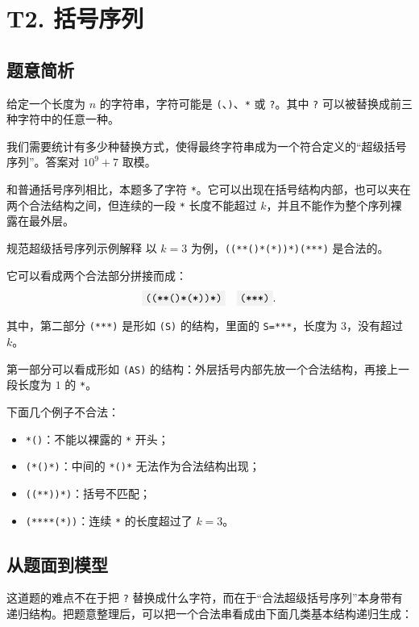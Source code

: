 \documentclass{book}
\newcommand{\code}[1]{\colorbox{codebg}{\texttt{#1}}}  %
\begin{document}
\section{T2. 括号序列}

\subsection{题意简析}

给定一个长度为 $n$ 的字符串，字符可能是 \code{(}、\code{)}、\code{*} 或 \code{?}。其中 \code{?} 可以被替换成前三种字符中的任意一种。

我们需要统计有多少种替换方式，使得最终字符串成为一个符合定义的“超级括号序列”。答案对 $10^9+7$ 取模。

和普通括号序列相比，本题多了字符 \code{*}。它可以出现在括号结构内部，也可以夹在两个合法结构之间，但连续的一段 \code{*} 长度不能超过 $k$，并且不能作为整个序列裸露在最外层。

\begin{examplebox}{规范超级括号序列示例解释}
以 $k=3$ 为例，\code{((**()*(*))*)(***)} 是合法的。

它可以看成两个合法部分拼接而成：
\[
\code{((**()*(*))*)}\quad \code{(***)}.
\]

其中，第二部分 \code{(***)} 是形如 \code{(S)} 的结构，里面的 \code{S=***}，长度为 $3$，没有超过 $k$。

第一部分可以看成形如 \code{(AS)} 的结构：外层括号内部先放一个合法结构，再接上一段长度为 $1$ 的 \code{*}。

下面几个例子不合法：

\begin{itemize}[leftmargin=2em,itemsep=1pt,topsep=2pt,parsep=0pt,partopsep=0pt]
    \item \code{*()}：不能以裸露的 \code{*} 开头；
    \item \code{(*()*)}：中间的 \code{*()*} 无法作为合法结构出现；
    \item \code{((**))*)}：括号不匹配；
    \item \code{(****(*))}：连续 \code{*} 的长度超过了 $k=3$。
\end{itemize}
\end{examplebox}

\subsection{从题面到模型}

这道题的难点不在于把 \code{?} 替换成什么字符，而在于“合法超级括号序列”本身带有递归结构。把题意整理后，可以把一个合法串看成由下面几类基本结构递归生成：
\end{document}
